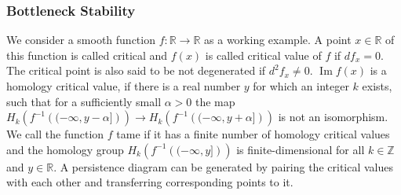 \documentclass[runningheads]{llncs}
\DeclareMathOperator{\Ima}{\text{Im}}
\begin{document}
\subsubsection{Bottleneck Stability}
We consider a smooth function $f: \mathbb{R} \rightarrow \mathbb{R}$ as a working example. A point $x \in \mathbb{R}$ of this function is called critical and $f(x)$ is called critical value of $f$ if $df_x = 0$. The critical point is also said to be not degenerated if $d^2f_x \neq 0$. $\Ima f(x)$ is a homology critical value, if there is a real number $y$ for which an integer $k$ exists, such that for a sufficiently small $\alpha > 0$ the map $H_k\left(f^{-1}\left((-\infty,y-\alpha]\right)\right)\rightarrow H_k\left(f^{-1}\left((-\infty,y+\alpha]\right)\right)$ is not an isomorphism. We call the function $f$ tame if it has a finite number of homology critical values and the homology group $H_k\left(f^{-1}\left((-\infty,y]\right)\right)$ is finite-dimensional for all $k\in \mathbb{Z}$ and $y \in \mathbb{R}$. A persistence diagram can be generated by pairing the critical values with each other and transferring corresponding points to it.
\end{document}
